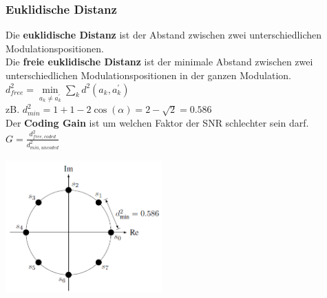 \subsubsection{Euklidische Distanz}
\begin{minipage}{13cm}
	Die \textbf{euklidische Distanz} ist der Abstand zwischen zwei
	unterschiedlichen Modulationspositionen.\\
	Die \textbf{freie euklidische Distanz} ist der minimale Abstand zwischen zwei
	unterschiedlichen Modulationspositionen in der ganzen Modulation.\\
	$d^2_{free}=\min \limits_{a_k \neq a_{k}^{'}} \sum \limits_k
	d^2(a_k,a_{k}^{'})$\\
	zB.	$d^2_{min}=1 + 1 -2\cos (\alpha)= 2-\sqrt{2} = 0.586$\\
	Der \textbf{Coding Gain} ist um welchen Faktor der SNR schlechter sein darf.\\
	$G = \frac{d^2_{free,coded}}{d^2_{min, uncoded}}$
\end{minipage}
\begin{minipage}{6cm}
	\includegraphics[width=6cm]{./bilder/EuklidischeDistanz.png}
\end{minipage}